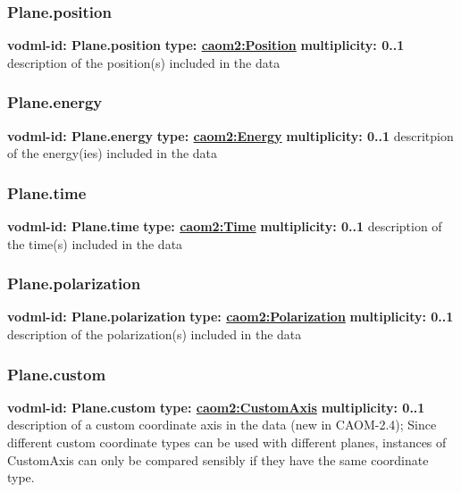     \subsubsection{Plane.position}
      \textbf{vodml-id: Plane.position} \newline
      \textbf{type: \hyperref[sect:Position]{caom2:Position}} \newline
      \textbf{multiplicity: 0..1} \newline
      description of the position(s) included in the data

    \subsubsection{Plane.energy}
      \textbf{vodml-id: Plane.energy} \newline
      \textbf{type: \hyperref[sect:Energy]{caom2:Energy}} \newline
      \textbf{multiplicity: 0..1} \newline
      descritpion of the energy(ies) included in the data

    \subsubsection{Plane.time}
      \textbf{vodml-id: Plane.time} \newline
      \textbf{type: \hyperref[sect:Time]{caom2:Time}} \newline
      \textbf{multiplicity: 0..1} \newline
      description of the time(s) included in the data

    \subsubsection{Plane.polarization}
      \textbf{vodml-id: Plane.polarization} \newline
      \textbf{type: \hyperref[sect:Polarization]{caom2:Polarization}} \newline
      \textbf{multiplicity: 0..1} \newline
      description of the polarization(s) included in the data

    \subsubsection{Plane.custom}
      \textbf{vodml-id: Plane.custom} \newline
      \textbf{type: \hyperref[sect:CustomAxis]{caom2:CustomAxis}} \newline
      \textbf{multiplicity: 0..1} \newline
      description of a custom coordinate axis in the data (new in CAOM-2.4); Since different custom coordinate types can be used with different planes, instances of CustomAxis can only be compared sensibly if they have the same coordinate type.

